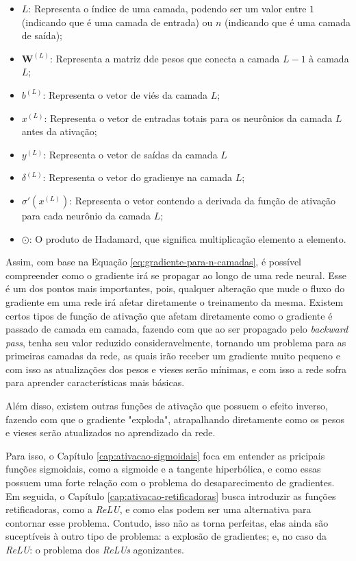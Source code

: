 \begin{itemize}
    \item $L$: Representa o índice de uma camada, podendo ser um valor entre $1$ (indicando que é uma camada de entrada) ou $n$ (indicando que é uma camada de saída);
    \item $\textbf{W}^{(L)}$: Representa a matriz dde pesos que conecta a camada $L - 1$ à camada $L$;
    \item $b^{(L)}$: Representa o vetor de viés da camada $L$;
    \item $x^{(L)}$: Representa o vetor de entradas totais para os neurônios da camada $L$ antes da ativação;
    \item $y^{(L)}$: Representa o vetor de saídas da camada $L$
    \item $\delta^{(L)}$: Representa o vetor do gradienye na camada $L$;
    \item $\sigma'(x^{(L)})$: Representa o vetor contendo a derivada da função de ativação para cada neurônio da camada $L$;
    \item $\odot$: O produto de Hadamard, que significa multiplicação elemento a elemento.
\end{itemize}

Assim, com base na Equação \ref{eq:gradiente-para-n-camadas}, é possível compreender como o gradiente irá se propagar ao longo de uma rede neural. Esse é um dos pontos mais importantes, pois, qualquer alteração que mude o fluxo do gradiente em uma rede irá afetar diretamente o treinamento da mesma. Existem certos tipos de função de ativação que afetam diretamente como o gradiente é passado de camada em camada, fazendo com que ao ser propagado pelo \textit{backward pass}, tenha seu valor reduzido consideravelmente, tornando um problema para as primeiras camadas da rede, as quais irão receber um gradiente muito pequeno e com isso as atualizações dos pesos e vieses serão mínimas, e com isso a rede sofra para aprender características mais básicas. 

Além disso, existem outras funções de ativação que possuem o efeito inverso, fazendo com que o gradiente "exploda", atrapalhando diretamente como os pesos e vieses serão atualizados no aprendizado da rede.

Para isso, o Capítulo \ref{cap:ativacao-sigmoidais} foca em entender as pricipais funções sigmoidais, como a sigmoide e a tangente hiperbólica, e como essas possuem uma forte relação com o problema do desaparecimento de gradientes. Em seguida, o Capítulo \ref{cap:ativacao-retificadoras} busca introduzir as funções retificadoras, como a \textit{ReLU}, e como elas podem ser uma alternativa para contornar esse problema. Contudo, isso não as torna perfeitas, elas ainda são suceptíveis à outro tipo de problema: a explosão de gradientes; e, no caso da \textit{ReLU}: o problema dos \textit{ReLUs} agonizantes.

